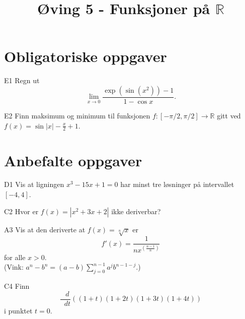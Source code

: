 \documentclass[a4paper,norsk,11pt]{interaktiv}
\title{Øving 5 - Funksjoner på $\mathbb{R}$}
\newcommand{\dee}{\mathop{}\!{d}}
\begin{document}

\maketitle



\section*{Obligatoriske oppgaver}

\begin{oppgave}{E1}
Regn ut
\[
\lim_{x\to 0}\frac{\exp\left(\sin(x^2)\right)-1}{1-\cos x}. 
\]
\end{oppgave}

\begin{oppgave}{E2}
Finn maksimum og minimum til funksjonen $f: [-\pi/2, \pi/2] \to \mathbb{R}$ gitt ved $f(x)=\sin |x|-\frac{x}{2}+1$. 
\end{oppgave}



\section*{Anbefalte oppgaver}

\begin{oppgave}{D1}
  Vis at ligningen $x^3 -15x +1 = 0$ har minst tre løsninger på
  intervallet $[-4,4]$. 
\end{oppgave}


\begin{oppgave}{C2}
  Hvor er $ f(x)=|x^2+3x+2| $ ikke deriverbar?
  \\[-6pt]
\end{oppgave}

\begin{oppgave}{A3}
  Vis at den deriverte at $f(x)=\sqrt[n]{x}$
  er \[f'(x)=\frac{1}{nx^{\left(\frac{n-1}{n}\right)}}\] for alle
  $x>0.$\\
  (Vink: $a^n-b^n = (a - b)\sum_{j = 0}^{n - 1} a^jb^{n - 1 - j}$.)
\end{oppgave}

\begin{oppgave}{C4}
  Finn
  \begin{equation*}
    \frac{\dee}{\dee t}\left((1+t)(1+2t)(1+3t)(1+4t)\right)
  \end{equation*}
  i punktet $t=0$.
  \\[-6pt]
\end{oppgave}
\end{document}
